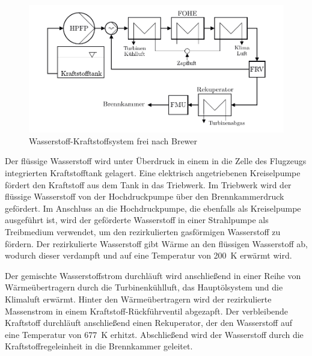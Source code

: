 \begin{figure}[ht]
\centering
\includegraphics[width=1\linewidth]{4_Abbildungen/2_Hauptteil/Kraftstoffsystem Abbildungen/brewer.pdf}
  \caption{Wasserstoff-Kraftstoffsystem frei nach Brewer \cite{Brewer.1991}}
  \label{fig:brewer}
\end{figure}
\FloatBarrier 

Der flüssige Wasserstoff wird unter Überdruck in einem in die Zelle des Flugzeugs integrierten Kraftstofftank  gelagert. Eine elektrisch angetriebenen Kreiselpumpe fördert den Kraftstoff aus dem Tank in das Triebwerk. Im Triebwerk wird der flüssige Wasserstoff von der Hochdruckpumpe über den Brennkammerdruck gefördert. Im Anschluss an die Hochdruckpumpe, die ebenfalls als Kreiselpumpe ausgeführt ist, wird der geförderte Wasserstoff in einer Strahlpumpe als Treibmedium verwendet, um den rezirkulierten gasförmigen Wasserstoff zu fördern. Der rezirkulierte Wasserstoff gibt Wärme an den flüssigen Wasserstoff ab, wodurch dieser verdampft und auf eine Temperatur von \SI{200}{K} erwärmt wird. 

Der gemischte Wasserstoffstrom durchläuft wird anschließend in einer Reihe von Wärmeübertragern durch die Turbinenkühlluft, das Hauptölsystem und die Klimaluft erwärmt. Hinter den Wärmeübertragern wird der rezirkulierte Massenstrom in einem Kraftstoff-Rückführventil abgezapft. Der verbleibende Kraftstoff durchläuft anschließend einen Rekuperator, der den Wasserstoff auf eine Temperatur von \SI{677}{K} erhitzt. Abschließend wird der Wasserstoff durch die Kraftstoffregeleinheit in die Brennkammer geleitet.